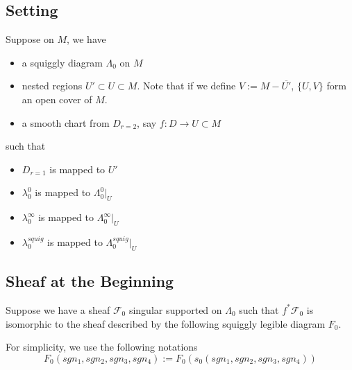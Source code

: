\subsection{Setting}
Suppose on $M$, we have
\begin{itemize}
\item  a squiggly diagram $\Lambda_0$ on $M$

\item nested regions $U' \subset U \subset M$. Note that if we define $V:= M - \overline{U'}$, $\{U,V\}$ form an open cover of $M$.

\item a smooth chart from $D_{r=2}$, say $f: D  \rightarrow U \subset M$
\end{itemize}
such that 
\begin{itemize}
\item $D_{r=1}$ is mapped to $U'$ 

\item $\lambda_0^0$ is mapped to $\Lambda_0^0 |_{U}$

\item $\lambda_0^\infty$ is mapped to $\Lambda_0^\infty |_{U}$

\item $\lambda_0^{squig}$ is mapped to $\Lambda_0^{squig} |_{U}$
\end{itemize}

\subsection{Sheaf at the Beginning}
Suppose we have a sheaf $\mathscr{F}_0$ singular supported on $\Lambda_0$ such that $f^*\mathscr{F}_0$ is isomorphic to the sheaf described by the following squiggly legible diagram $F_0$.

For simplicity, we use the following notations
\[
F_0(sgn_1,sgn_2,sgn_3,sgn_4):= F_0(s_0(sgn_1,sgn_2,sgn_3,sgn_4))
\]

